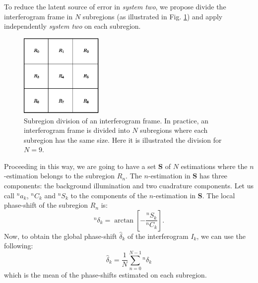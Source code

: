 \documentclass[letterpaper,12pt]{article}   %
\begin{document}
To reduce the latent source of error in \emph{system two}, we propose
divide the interferogram frame in $N$ subregions (as illustrated in
Fig. \ref{fig:subregions}) and apply independently \emph{system two}
on each subregion.
\begin{figure}
  \centering
  \includegraphics[width=4cm]{regions.eps}
  \caption{Subregion division of an interferogram frame. In practice,
    an interferogram frame is divided into $N$ subregions where each
    subregion has the same size. Here it is illustrated the division
    for $N=9$.\label{fig:subregions}}
\end{figure}
Proceeding in this way, we are going to have a set $\mathbf{S}$ of $N$
estimations where the $n$-estimation belongs to the subregion
$R_n$. The $n$-estimation in $\mathbf{S}$ has three components: the
background illumination and two cuadrature components. Let us call
$^na_k$, $^nC_k$ and $^nS_k$ to the components of the $n$-estimation
in $\mathbf{S}$. The local phase-shift of the subregion $R_n$ is:
\begin{equation}
  ^n\delta_k = \arctan\left[-\frac{^nS_k}{^nC_k}\right].
\end{equation}
Now, to obtain the global phase-shift $\hat\delta_k$ of the
interferogram $I_k$, we can use the following:
\begin{equation}
  \hat\delta_k = \frac{1}{N} \sum_{n=0}^{N-1} {^n\delta_k}
\end{equation}
which is the mean of the phase-shifts estimated on each subregion.


 
\end{document}
